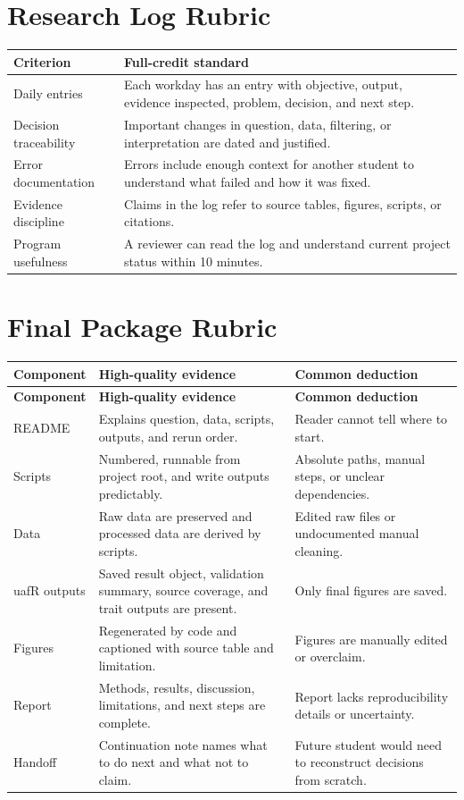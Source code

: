 \section{Research Log Rubric}
\begin{tabularx}{\textwidth}{p{}Y}
\toprule
\textbf{Criterion} & \textbf{Full-credit standard}\\
\midrule
Daily entries & Each workday has an entry with objective, output, evidence inspected, problem, decision, and next step.\\
Decision traceability & Important changes in question, data, filtering, or interpretation are dated and justified.\\
Error documentation & Errors include enough context for another student to understand what failed and how it was fixed.\\
Evidence discipline & Claims in the log refer to source tables, figures, scripts, or citations.\\
Program usefulness & A reviewer can read the log and understand current project status within 10 minutes.\\
\bottomrule
\end{tabularx}

\section{Final Package Rubric}
\begin{longtable}{p{}p{}p{}}
\toprule
\textbf{Component} & \textbf{High-quality evidence} & \textbf{Common deduction}\\
\midrule
\endfirsthead
\toprule
\textbf{Component} & \textbf{High-quality evidence} & \textbf{Common deduction}\\
\midrule
\endhead
README & Explains question, data, scripts, outputs, and rerun order. & Reader cannot tell where to start.\\
Scripts & Numbered, runnable from project root, and write outputs predictably. & Absolute paths, manual steps, or unclear dependencies.\\
Data & Raw data are preserved and processed data are derived by scripts. & Edited raw files or undocumented manual cleaning.\\
uafR outputs & Saved result object, validation summary, source coverage, and trait outputs are present. & Only final figures are saved.\\
Figures & Regenerated by code and captioned with source table and limitation. & Figures are manually edited or overclaim.\\
Report & Methods, results, discussion, limitations, and next steps are complete. & Report lacks reproducibility details or uncertainty.\\
Handoff & Continuation note names what to do next and what not to claim. & Future student would need to reconstruct decisions from scratch.\\
\bottomrule
\end{longtable}
